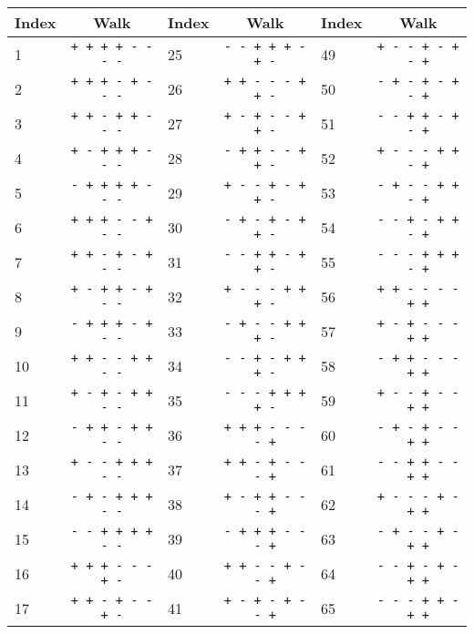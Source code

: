 \begin{table}[htbp]

\center

\begin{tabular}{lc|lc|lc}
 Index & Walk & Index & Walk & Index & Walk \\ \hline
 1 &  \verb=+ + + + - - - -= & 25  &  \verb=- - + + + - + -= & 49 &
\verb=+ - - + - + - += \\
 2 &  \verb=+ + + - + - - -= & 26  &  \verb=+ + - - - + + -=    & 50 &
\verb=- + - + - + - += \\
 3 &  \verb=+ + - + + - - -= & 27  &  \verb=+ - + - - + + -=    & 51 &
\verb=- - + + - + - += \\
 4 &  \verb=+ - + + + - - -= & 28  &  \verb=- + + - - + + -=    & 52 &
\verb=+ - - - + + - += \\
 5 &  \verb=- + + + + - - -= & 29  &  \verb=+ - - + - + + -=    & 53 &
\verb=- + - - + + - += \\
 6 &  \verb=+ + + - - + - -= & 30  &  \verb=- + - + - + + -=    & 54 &
\verb=- - + - + + - += \\
 7 &  \verb=+ + - + - + - -= & 31  &  \verb=- - + + - + + -=    & 55 &
\verb=- - - + + + - += \\
 8 &  \verb=+ - + + - + - -= & 32  &  \verb=+ - - - + + + -=    & 56 &
\verb=+ + - - - - + += \\
 9 &  \verb=- + + + - + - -= & 33  &  \verb=- + - - + + + -=    & 57 &
\verb=+ - + - - - + += \\
10 &  \verb=+ + - - + + - -= & 34  &  \verb=- - + - + + + -=    & 58 &
\verb=- + + - - - + += \\
11 &  \verb=+ - + - + + - -= & 35  &  \verb=- - - + + + + -=    & 59 &
\verb=+ - - + - - + += \\
12 &  \verb=- + + - + + - -= & 36  &  \verb=+ + + - - - - +=    & 60 &
\verb=- + - + - - + += \\
13 &  \verb=+ - - + + + - -= & 37  &  \verb=+ + - + - - - +=    & 61 &
\verb=- - + + - - + += \\
14 &  \verb=- + - + + + - -= & 38  &  \verb=+ - + + - - - +=    & 62 &
\verb=+ - - - + - + += \\
15 &  \verb=- - + + + + - -= & 39  &  \verb=- + + + - - - +=    & 63 &
\verb=- + - - + - + += \\
16 &  \verb=+ + + - - - + -= & 40  &  \verb=+ + - - + - - +=    & 64 &
\verb=- - + - + - + += \\
17 &  \verb=+ + - + - - + -= & 41  &  \verb=+ - + - + - - +=    & 65 &
\verb=- - - + + - + += \\

\end{tabular}
\end{table}
